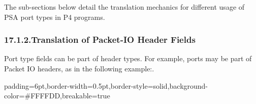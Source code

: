 \documentclass[11pt]{article}
\begin{document}
{%
The sub-sections below detail the translation mechanics for different usage of
PSA port types in P4 programs.%

\subsubsection{17.1.2.\hspace*{0.5em}Translation of Packet-IO Header Fields}\label{sec-translation-of-packet-io-header-fields}%

\noindent{}Port type fields can be part of header types. For example, ports may be part of
Packet IO headers, as in the following example:.%

\begin{mdbmargintb}{6pt}{6pt}%
\begin{mdblock}{padding=6pt,border-width=0.5pt,border-style=solid,background-color=\#FFFFDD,breakable=true}%
\begin{mdpre}%
\end{mdpre}%
\end{mdblock}%
\end{mdbmargintb}%

}
\end{document}
